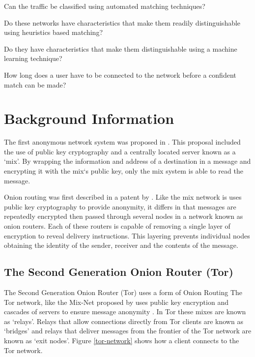 \documentclass{conference}
\begin{document}
\begin{enumerate*}
\item Can the traffic be classified using automated matching techniques?
\item Do these networks have characteristics that make them readily distinguishable using heuristics based matching?
\item Do they have characteristics that make them distinguishable using a machine learning technique?
\item How long does a user have to be connected to the network before a confident match can be made?
\end{enumerate*}

\section{Background Information}

The first anonymous network system was proposed in \citet{Chaum:1981p296}. This proposal included the use of public key cryptography and a centrally located server known as a `mix'. By wrapping the information and address of a destination in a message and encrypting it with the mix`s public key, only the mix system is able to read the message.

Onion routing was first described in a patent by \cite{Michael:2001}. Like the mix network is uses public key cryptography to provide anonymity, it differs in that messages are repeatedly encrypted then passed through several nodes in a network known as onion routers. Each of these routers is capable of removing a single layer of encryption to reveal delivery instructions. This layering prevents individual nodes obtaining the identity of the sender, receiver and the contents of the message.

\subsection{The Second Generation Onion Router (Tor)}

The Second Generation Onion Router (Tor) uses a form of Onion Routing 
The Tor network, like the Mix-Net proposed by \citet{Chaum:1981p296} uses public key encryption and cascades of servers to ensure message anonymity \citep{Dingledine:2004p314}. In Tor these mixes are known as ‘relays’. Relays that allow connections directly from Tor clients are known as ‘bridges’ and relays that deliver messages from the frontier of the Tor network are known as ‘exit nodes’. Figure \ref{tor-network} shows how a client connects to the Tor network.
\end{document}
